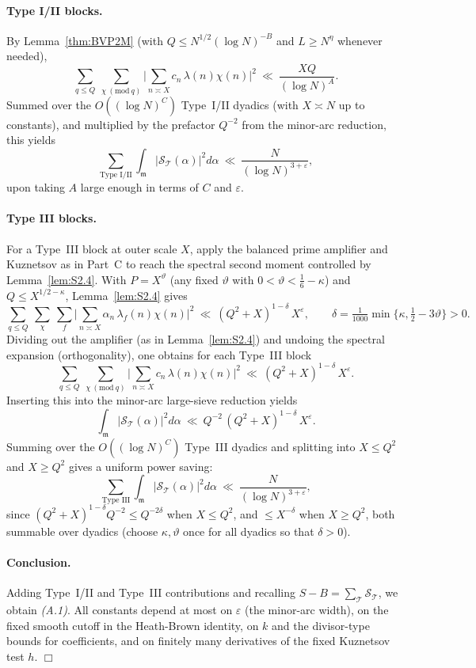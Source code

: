 \documentclass[11pt]{article}
\newcommand{\qedwhite}{\hfill \ensuremath{\Box}}
\theoremstyle{definition}
\theoremstyle{remark}
\numberwithin{equation}{part}
\begin{document}
\paragraph{Type I/II blocks.}
By Lemma~\ref{thm:BVP2M} (with $Q\le N^{1/2}(\log N)^{-B}$ and $L\ge N^{\eta}$ whenever needed),
\[
	\sum_{q\le Q}\ \sum_{\chi\ (\mathrm{mod}\ q)}
	\Big|\sum_{n\asymp X} c_n\,\lambda(n)\chi(n)\Big|^2
	\ \ll\ \frac{XQ}{(\log N)^{A}}.
\]
Summed over the $O((\log N)^C)$ Type~I/II dyadics (with $X\asymp N$ up to constants), and multiplied by the prefactor $Q^{-2}$ from the minor-arc reduction, this yields
\[
	\sum_{\text{Type I/II}}\int_{\mathfrak m}|\mathcal S_{\mathcal T}(\alpha)|^2 d\alpha
	\ \ll\ \frac{N}{(\log N)^{3+\varepsilon}},
\]
upon taking $A$ large enough in terms of $C$ and $\varepsilon$.

\paragraph{Type III blocks.}
For a Type~III block at outer scale $X$, apply the balanced prime amplifier and Kuznetsov as in Part~C to reach the spectral second moment controlled by Lemma~\ref{lem:S2.4}.
With $P=X^\vartheta$ (any fixed $\vartheta$ with $0<\vartheta<\tfrac16-\kappa$) and $Q\le X^{1/2-\kappa}$, Lemma~\ref{lem:S2.4} gives
\[
	\sum_{q\le Q}\ \sum_{\chi}\ \sum_f
	\Bigg|\sum_{n\asymp X}\alpha_n\,\lambda_f(n)\chi(n)\Bigg|^2
	\ \ll\ (Q^2+X)^{1-\delta}\,X^{\varepsilon},
	\qquad
	\delta=\tfrac{1}{1000}\min\{\kappa,\tfrac12-3\vartheta\}>0.
\]
Dividing out the amplifier (as in Lemma~\ref{lem:S2.4}) and undoing the spectral expansion (orthogonality), one obtains for each Type~III block
\[
	\sum_{q\le Q}\ \sum_{\chi\ (\mathrm{mod}\ q)}
	\Big|\sum_{n\asymp X} c_n\,\lambda(n)\chi(n)\Big|^2
	\ \ll\ (Q^2+X)^{1-\delta}\,X^{\varepsilon}.
\]
Inserting this into the minor-arc large-sieve reduction yields
\[
	\int_{\mathfrak m}|\mathcal S_{\mathcal T}(\alpha)|^2 d\alpha
	\ \ll\ Q^{-2}\,(Q^2+X)^{1-\delta}\,X^{\varepsilon}.
\]
Summing over the $O((\log N)^C)$ Type~III dyadics and splitting into $X\le Q^2$ and $X\ge Q^2$ gives a uniform power saving:
\[
	\sum_{\text{Type III}}\int_{\mathfrak m}|\mathcal S_{\mathcal T}(\alpha)|^2 d\alpha
	\ \ll\ \frac{N}{(\log N)^{3+\varepsilon}},
\]
since $(Q^2+X)^{1-\delta}Q^{-2}\le Q^{-2\delta}$ when $X\le Q^2$, and $\le X^{-\delta}$ when $X\ge Q^2$, both summable over dyadics (choose $\kappa,\vartheta$ once for all dyadics so that $\delta>0$).

\paragraph{Conclusion.}
Adding Type~I/II and Type~III contributions and recalling $S-B=\sum_{\mathcal T}\mathcal S_{\mathcal T}$, we obtain \emph{(A.1)}. All constants depend at most on $\varepsilon$ (the minor-arc width), on the fixed smooth cutoff in the Heath-Brown identity, on $k$ and the divisor-type bounds for coefficients, and on finitely many derivatives of the fixed Kuznetsov test $h$.
\qedwhite
\end{document}
